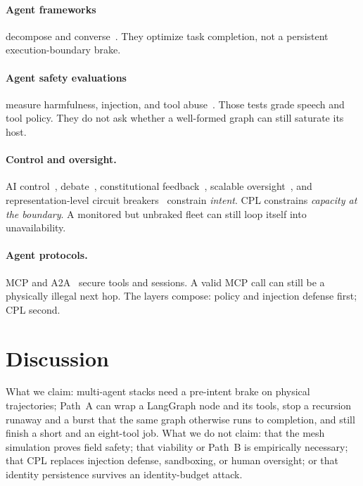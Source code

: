 \documentclass{article}
\begin{document}
\paragraph{Agent frameworks} decompose and converse~\cite{yao2023react,wu2023autogen,hong2023metagpt,li2023camel,langchain2025langgraph,crewai2025,park2023generative,shinn2023reflexion}.
They optimize task completion, not a persistent execution-boundary brake.

\paragraph{Agent safety evaluations} measure harmfulness, injection, and tool abuse~\cite{debenedetti2024agentdojo,andriushchenko2024agentharm,ruan2024identifying,greshake2023not}.
Those tests grade speech and tool policy.
They do not ask whether a well-formed graph can still saturate its host.

\paragraph{Control and oversight.}
AI control~\cite{greenblatt2024control}, debate~\cite{irving2018debate}, constitutional feedback~\cite{bai2022constitutional}, scalable oversight~\cite{kenton2024oversight}, and representation-level circuit breakers~\cite{zou2024circuit} constrain \emph{intent}.
CPL constrains \emph{capacity at the boundary}.
A monitored but unbraked fleet can still loop itself into unavailability.

\paragraph{Agent protocols.}
MCP and A2A~\cite{anthropic2024mcp,google2025a2a,hou2025mcp} secure tools and sessions.
A valid MCP call can still be a physically illegal next hop.
The layers compose: policy and injection defense first; CPL second.

\section{Discussion}
\label{sec:disc}

What we claim: multi-agent stacks need a pre-intent brake on physical trajectories; Path~A can wrap a LangGraph node and its tools, stop a recursion runaway and a burst that the same graph otherwise runs to completion, and still finish a short and an eight-tool job.
What we do not claim: that the mesh simulation proves field safety; that viability or Path~B is empirically necessary; that CPL replaces injection defense, sandboxing, or human oversight; or that identity persistence survives an identity-budget attack.
\end{document}
